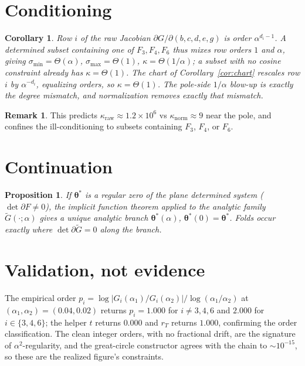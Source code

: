 \documentclass[11pt]{article}
\newtheorem{corollary}{Corollary}\newtheorem{proposition}{Proposition}
\theoremstyle{definition}\newtheorem{definition}{Definition}\newtheorem{remark}{Remark}
\begin{document}
\section{Conditioning}
\begin{corollary}\label{cor:cond}
Row $i$ of the raw Jacobian $\partial G/\partial(b,c,d,e,g)$ is order $\alpha^{d_i-1}$.
A determined subset containing one of $F_3,F_4,F_6$ thus mixes row orders $1$ and
$\alpha$, giving $\sigma_{\min}=\Theta(\alpha)$, $\sigma_{\max}=\Theta(1)$,
$\kappa=\Theta(1/\alpha)$; a subset with no cosine constraint already has
$\kappa=\Theta(1)$. The chart of Corollary~\ref{cor:chart} rescales row $i$ by
$\alpha^{-d_i}$, equalizing orders, so $\kappa=\Theta(1)$. The pole-side $1/\alpha$
blow-up is exactly the degree mismatch, and normalization removes exactly that mismatch.
\end{corollary}
\begin{remark}
This predicts $\kappa_{\mathrm{raw}}\approx1.2\times10^{6}$ vs
$\kappa_{\mathrm{norm}}\approx9$ near the pole, and confines the ill-conditioning to
subsets containing $F_3$, $F_4$, or $F_6$.
\end{remark}

\section{Continuation}
\begin{proposition}\label{prop:cont}
If $\boldsymbol\theta^\ast$ is a regular zero of the plane determined system
($\det\partial F\neq0$), the implicit function theorem applied to the analytic family
$\widetilde G(\cdot;\alpha)$ gives a unique analytic branch
$\boldsymbol\theta^\ast(\alpha)$, $\boldsymbol\theta^\ast(0)=\boldsymbol\theta^\ast$.
Folds occur exactly where $\det\partial\widetilde G=0$ along the branch.
\end{proposition}

\section{Validation, not evidence}
The empirical order $p_i=\log|G_i(\alpha_1)/G_i(\alpha_2)|/\log(\alpha_1/\alpha_2)$ at
$(\alpha_1,\alpha_2)=(0.04,0.02)$ returns $p_i=1.000$ for $i\neq3,4,6$ and $2.000$ for
$i\in\{3,4,6\}$; the helper $t$ returns $0.000$ and $r_T$ returns $1.000$, confirming
the order classification. The clean integer orders, with no fractional drift, are the
signature of $\alpha^2$-regularity, and the great-circle constructor agrees with the
chain to $\sim10^{-15}$, so these are the realized figure's constraints.
\end{document}
